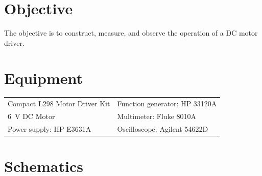 

\section{Objective}
\label{sec:objective}

The objective is to construct, measure, and observe the operation of a DC motor driver.

\section{Equipment}
\label{sec:equipment}

\begin{tabular}{ll}
  \centering
  Compact L298 Motor Driver Kit & Function generator: HP 33120A \\
  \SI{6}{V} DC Motor            & Multimeter: Fluke 8010A       \\
  Power supply: HP E3631A       & Oscilloscope: Agilent 54622D  \\
\end{tabular}

 \section{Schematics}
 \label{sec:schematics}

